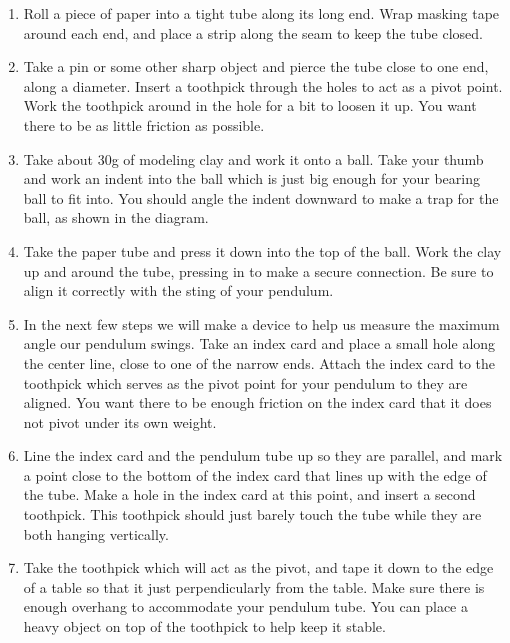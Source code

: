     \begin{enumerate}
        \item Roll a piece of paper into a tight tube along its long end. Wrap masking tape around each end, and place a strip along the seam to keep the tube closed.
        \item Take a pin or some other sharp object and pierce the tube close to one end, along a diameter.  Insert a toothpick through the holes to act as a pivot point.  Work the toothpick around in the hole for a bit to loosen it up. You want there to be as little friction as possible.
        \item Take about 30g of modeling clay and work it onto a ball.  Take your thumb and work an indent into the ball which is just big enough for your bearing ball to fit into.  You should angle the indent downward to make a trap for the ball, as shown in the diagram.


        \item Take the paper tube and press it down into the top of the ball. Work the clay up and around the tube, pressing in to make a secure connection. Be sure to align it correctly with the sting of your pendulum.
        \item In the next few steps we will make a device to help us measure the maximum angle our pendulum swings. Take an index card and place a small hole along the center line, close to one of the narrow ends.  Attach the index card to the toothpick which serves as the pivot point for your pendulum to they are aligned. You want there to be enough friction on the index card that it does not pivot under its own weight.
        \item Line the index card and the pendulum tube up so they are parallel, and mark a point close to the bottom of the index card that lines up with the edge of the tube.  Make a hole in the index card at this point, and insert a second toothpick. This toothpick should just barely touch the tube while they are both hanging vertically.
        \item Take the toothpick which will act as the pivot, and tape it down to the edge of a table so that it just perpendicularly from the table. Make sure there is enough overhang to accommodate your pendulum tube.  You can place a heavy object on top of the toothpick to help keep it stable.

    \end{enumerate}

